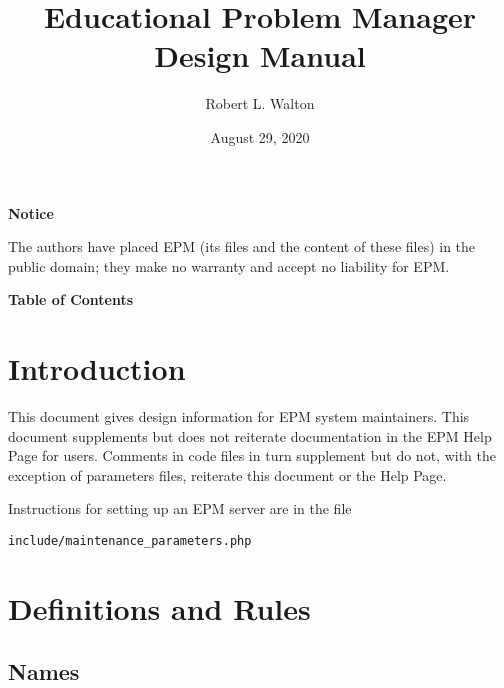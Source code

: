\documentclass[12pt]{article}
\makeatletter
\renewcommand\tableofcontents{%
    \begin{list}{}%
	     {\setlength{\itemsep}{0in}%
	      \setlength{\topsep}{0in}%
	      \setlength{\parsep}{1ex}%
	      \setlength{\labelwidth}{0in}%
	      \setlength{\baselineskip}{1.5ex}%
	      \setlength{\leftmargin}{0.8in}%
	      \setlength{\rightmargin}{0.8in}}%
    \item\@starttoc{toc}%
    \end{list}}
\makeatother
\begin{document}
        
\title{Educational Problem Manager\\
Design Manual}

\author{Robert L. Walton}

\date{August 29, 2020}
 
\maketitle

\begin{center}
{\large \bf Notice}
\\[2ex]
\begin{minipage}{5.5in}
The authors have placed EPM (its files and the content of these files) in
the public domain; they make no warranty and accept
no liability for EPM.
\end{minipage}
\end{center}
\begin{center}
\large \bf Table of Contents
\end{center}

\bigskip

\tableofcontents 

\newpage

\section{Introduction}

This document gives design information for EPM system maintainers.
This document supplements but does not reiterate
documentation in the EPM Help Page for
users.  Comments in code files in turn supplement but do not, with
the exception of parameters files,
reiterate this document or the Help Page.

Instructions for setting up an EPM server are in the file
\begin{center}
{\tt include/maintenance\_parameters.php}
\end{center}

\section{Definitions and Rules}

\subsection{Names}\label{NAMES}
\end{document}
